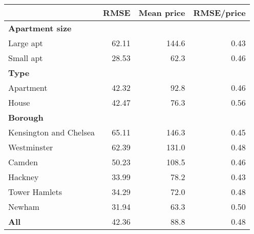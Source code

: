 
\begin{tabular}{lrrr}
\toprule
 & RMSE & Mean price & RMSE/price\\
\midrule
\textbf{Apartment size} &  &  & \\
Large apt & 62.11 & 144.6 & 0.43\\
Small apt & 28.53 & 62.3 & 0.46\\
\textbf{Type} &  &  & \\
Apartment & 42.32 & 92.8 & 0.46\\
House & 42.47 & 76.3 & 0.56\\
\textbf{Borough} &  &  & \\
Kensington and Chelsea & 65.11 & 146.3 & 0.45\\
Westminster & 62.39 & 131.0 & 0.48\\
Camden & 50.23 & 108.5 & 0.46\\
Hackney & 33.99 & 78.2 & 0.43\\
Tower Hamlets & 34.29 & 72.0 & 0.48\\
Newham & 31.94 & 63.3 & 0.50\\
\midrule
\textbf{All} & 42.36 & 88.8 & 0.48\\
\bottomrule
\end{tabular}